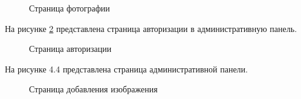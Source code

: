 \begin{figure}[ht]
\caption{Страница фотографии}
\label{menu:image}
\end{figure}

\newpage
На рисунке \ref{enter:image} представлена страница авторизации в административную панель.

\begin{figure}[ht]
\caption{Страница авторизации}
\label{enter:image}
\end{figure}

\newpage
На рисунке 4.4 представлена страница административной панели.

\begin{figure}[ht]
	\caption{Страница добавления изображения}
	\label{add:image}
\end{figure}

